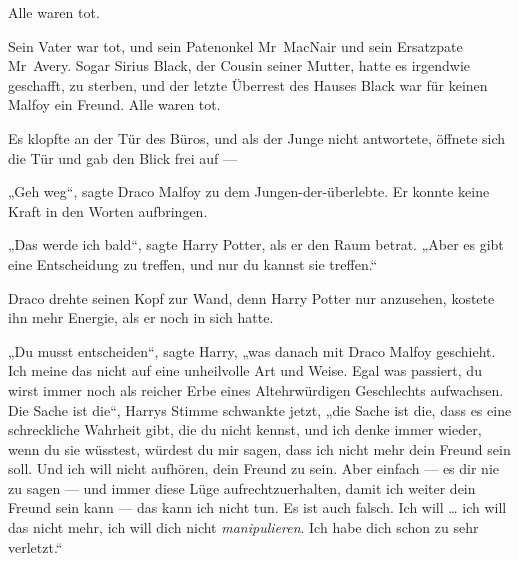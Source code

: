Alle waren tot.

Sein Vater war tot, und sein Patenonkel Mr~MacNair und sein Ersatzpate Mr~Avery. Sogar Sirius Black, der Cousin seiner Mutter, hatte es irgendwie geschafft, zu sterben, und der letzte Überrest des Hauses Black war für keinen Malfoy ein Freund. Alle waren tot.

Es klopfte an der Tür des Büros, und als der Junge nicht antwortete, öffnete sich die Tür und gab den Blick frei auf —

„Geh weg“, sagte Draco Malfoy zu dem Jungen-der-überlebte. Er konnte keine Kraft in den Worten aufbringen.

„Das werde ich bald“, sagte Harry Potter, als er den Raum betrat.
„Aber es gibt eine Entscheidung zu treffen, und nur du kannst sie treffen.“

Draco drehte seinen Kopf zur Wand, denn Harry Potter nur anzusehen, kostete ihn mehr Energie, als er noch in sich hatte.

„Du musst entscheiden“, sagte Harry, „was danach mit Draco Malfoy geschieht. Ich meine das nicht auf eine unheilvolle Art und Weise. Egal was passiert, du wirst immer noch als reicher Erbe eines Altehrwürdigen Geschlechts aufwachsen. Die Sache ist die“, Harrys Stimme schwankte jetzt, „die Sache ist die, dass es eine schreckliche Wahrheit gibt, die du nicht kennst, und ich denke immer wieder, wenn du sie wüsstest, würdest du mir sagen, dass ich nicht mehr dein Freund sein soll. Und ich will nicht aufhören, dein Freund zu sein. Aber einfach — es dir nie zu sagen — und immer diese Lüge aufrechtzuerhalten, damit ich weiter dein Freund sein kann — das kann ich nicht tun. Es ist auch falsch. Ich will … ich will das nicht mehr, ich will dich nicht \emph{manipulieren}. Ich habe dich schon zu sehr verletzt.“

